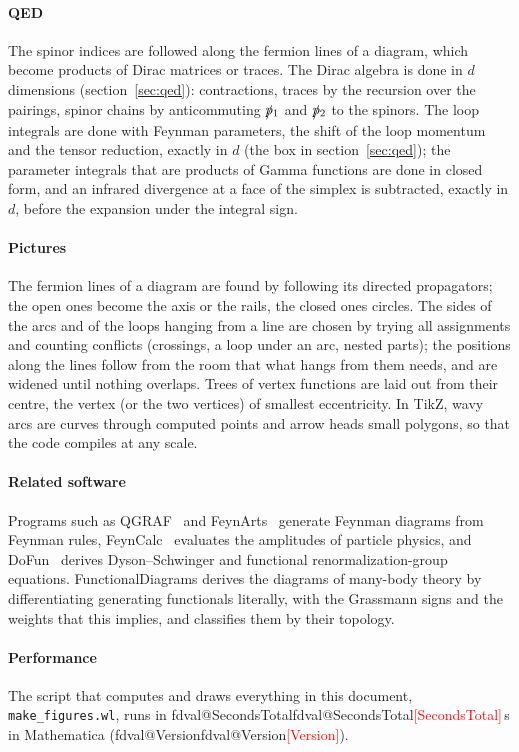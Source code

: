 \documentclass[11pt,a4paper]{article}
\makeatletter
\newcommand{\pkg}[1]{\texttt{#1}}
\newcommand{\val}[1]{\ifcsname fdval@#1\endcsname\csname fdval@#1\endcsname\else\textcolor{red}{[#1]}\fi}
\makeatother
\begin{document}
\paragraph{QED} The spinor indices are followed along the fermion lines of a diagram, which become products of Dirac
matrices or traces. The Dirac algebra is done in $d$ dimensions (section~\ref{sec:qed}): contractions, traces by the recursion over the
pairings, spinor chains by anticommuting $\slashed{p}{}_1$ and $\slashed{p}{}_2$
to the spinors. The loop integrals are done with Feynman parameters, the shift of the loop momentum and the tensor
reduction, exactly in $d$ (the box in section~\ref{sec:qed}); the parameter integrals that are products of Gamma functions are done in closed form, and an
infrared divergence at a face of the simplex is subtracted, exactly in $d$, before the expansion under the integral sign.

\paragraph{Pictures} The fermion lines of a diagram are found by following its directed propagators; the open ones become
the axis or the rails, the closed ones circles. The sides of the arcs and of the loops hanging from a line are chosen by
trying all assignments and counting conflicts (crossings, a loop under an arc, nested parts); the positions along the
lines follow from the room that what hangs from them needs, and are widened until nothing overlaps. Trees of vertex
functions are laid out from their centre, the vertex (or the two vertices) of smallest eccentricity. In TikZ, wavy arcs
are curves through computed points and arrow heads small polygons, so that the code compiles at any scale.

\paragraph{Related software} Programs such as QGRAF~\cite{Nogueira1993} and FeynArts~\cite{Hahn2001} generate Feynman
diagrams from Feynman rules, FeynCalc~\cite{Shtabovenko2020} evaluates the amplitudes of particle physics, and
DoFun~\cite{HuberBraun2012,HuberCyrolPawlowski2020} derives Dyson--Schwinger and functional renormalization-group equations.
FunctionalDiagrams derives the diagrams of many-body theory by differentiating generating functionals literally, with the
Grassmann signs and the weights that this implies, and classifies them by their topology.

\paragraph{Performance} The script that computes and draws everything in this document, \pkg{make\_figures.wl},
runs in \val{SecondsTotal}\,s in Mathematica (\val{Version}).
\end{document}
